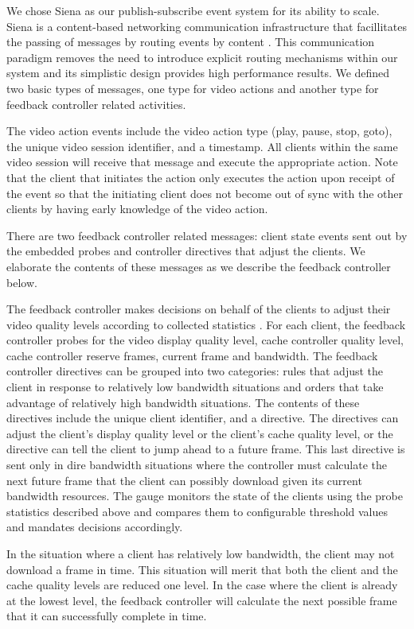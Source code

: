 \documentclass{sig-alternate}
\begin{document}
We chose Siena as our publish-subscribe event system for its ability
to scale.  Siena is a content-based networking communication
infrastructure that facillitates the passing of messages by routing
events by content \cite{SIENA}.  This communication paradigm removes
the need to introduce explicit routing mechanisms within our system
and its simplistic design provides high performance results.  We
defined two basic types of messages, one type for video actions and
another type for feedback controller related activities.  

The video action events include the video action type (play, pause,
stop, goto), the unique video session identifier, and a timestamp.
All clients within the same video session will receive that message
and execute the appropriate action.  Note that the client that
initiates the action only executes the action upon receipt of the
event so that the initiating client does not become out of sync with
the other clients by having early knowledge of the video action.

There are two feedback controller related messages: client state
events sent out by the embedded probes and controller directives that
adjust the clients.  We elaborate the contents of these messages as we
describe the feedback controller below.

The feedback controller makes decisions on behalf of the clients to
adjust their video quality levels according to collected statistics .
For each client, the feedback controller probes for the video display
quality level, cache controller quality level, cache controller
reserve frames, current frame and bandwidth.  The feedback controller
directives can be grouped into two categories: rules that adjust the
client in response to relatively low bandwidth situations and orders
that take advantage of relatively high bandwidth situations.  The
contents of these directives include the unique client identifier, and
a directive.  The directives can adjust the client's display quality
level or the client's cache quality level, or the directive can tell
the client to jump ahead to a future frame.  This last directive is
sent only in dire bandwidth situations where the controller must
calculate the next future frame that the client can possibly download
given its current bandwidth resources.  The gauge monitors the state
of the clients using the probe statistics described above and compares
them to configurable threshold values and mandates decisions
accordingly.

In the situation where a client has relatively low bandwidth, the
client may not download a frame in time.  This situation will merit
that both the client and the cache quality levels are reduced one
level.  In the case where the client is already at the lowest level,
the feedback controller will calculate the next possible frame that it
can successfully complete in time.
\end{document}
